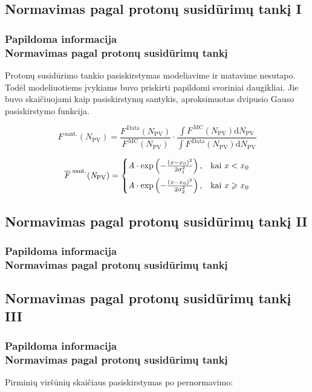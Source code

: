 \documentclass[xcolor=dvipsnames]{beamer}
\begin{document}
\begin{frame}
\subsection{Normavimas pagal protonų susidūrimų tankį I}
\frametitle{Papildoma informacija\\ \normalsize Normavimas pagal protonų susidūrimų tankį}
Protonų susidūrimo tankio pasiskirstymas modeliavime ir matavime nesutapo. Todėl modeliuotiems įvykiams buvo priskirti papildomi svoriniai daugikliai. Jie buvo skaičiuojami kaip pasiskirstymų santykis, aproksimuotas dvipusio Gauso pasiskirstymo funkcija.

\begin{equation*}
\mathit{F}^{\mathrm{\;sant.}}(\mathit{N}_{\mathrm{PV}})=\frac{\mathit{F}^{\,\mathrm{Data}}(\mathit{N}_{\mathrm{PV}})}{\mathit{F}^{\,\mathrm{MC}}(\mathit{N}_{\mathrm{PV}})}\cdot \frac{\int \mathit{F}^{\,\mathrm{MC}}(\mathit{N}_{\mathrm{PV}}) \mathrm{d}\mathit{N}_{\mathrm{PV}}}{\int \mathit{F}^{\,\mathrm{Data}}(\mathit{N}_{\mathrm{PV}}) \mathrm{d}\mathit{N}_{\mathrm{PV}}}
\end{equation*}

\begin{equation*}
\overline{\mathit{F}}^{\mathrm{\;sant.}}(\mathit{N}_{\mathrm{PV}})=
\begin{cases} \mathit{A}\cdot \exp\left(-\frac{(\mathit{x}-\mathit{x}_{\,0})^{2}}{2\sigma_{1}^{2}}\right), & \mbox{kai } \mathit{x}<\mathit{x}_{\,0} \vspace{0.2cm} \\ 
\mathit{A}\cdot \exp\left(-\frac{(\mathit{x}-\mathit{x}_{\,0})^{2}}{2\sigma_{2}^{2}}\right), & \mbox{kai } \mathit{x}\geqslant \mathit{x}_{\,0} \end{cases}
\end{equation*}
\end{frame}

\begin{frame}
\subsection{Normavimas pagal protonų susidūrimų tankį II}
\frametitle{Papildoma informacija\\ \normalsize Normavimas pagal protonų susidūrimų tankį}
\end{frame}

\begin{frame}
\subsection{Normavimas pagal protonų susidūrimų tankį III}
\frametitle{Papildoma informacija\\ \normalsize Normavimas pagal protonų susidūrimų tankį}
Pirminių viršūnių skaičiaus pasiskirstymas po pernormavimo:
\end{frame}
\end{document}
